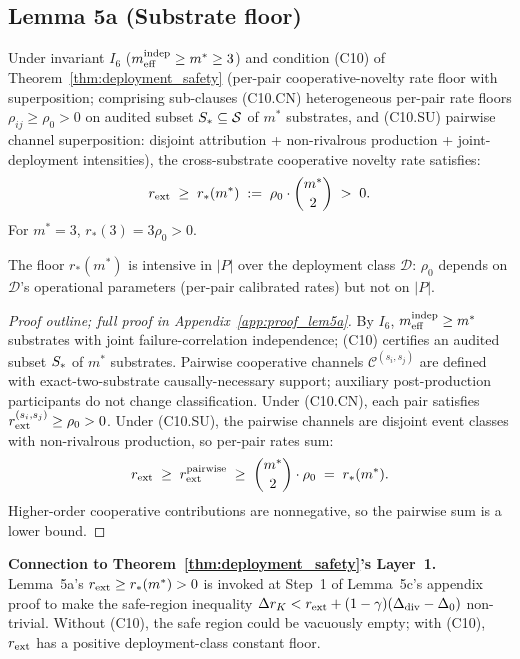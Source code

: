 \subsection{Lemma 5a (Substrate floor)}
\label{sec:lem5a}

\renewcommand{\thelemma}{5a}
\begin{lemma}
\label{lem:5a}
Under invariant $I_6$ ($m_{\mathrm{eff}}^{\mathrm{indep}} \geq m^* \geq 3$) and condition (C10) of
    Theorem~\ref{thm:deployment_safety} (per-pair cooperative-novelty rate
    floor with superposition; comprising sub-clauses (C10.CN) heterogeneous
    per-pair rate floors $\rho_{ij} \geq \rho_0 > 0$ on audited subset $S_*
    \subseteq \mathcal{S}$ of $m^*$ substrates, and (C10.SU) pairwise channel
    superposition: disjoint attribution + non-rivalrous production +
    joint-deployment intensities), the cross-substrate cooperative novelty rate
    satisfies:
\[
  r_{\mathrm{ext}} \;\geq\; r_*(m^*) \;:=\; \rho_0 \cdot \binom{m^*}{2} \;>\; 0.
\]
For $m^* = 3$, $r_*(3) = 3\rho_0 > 0$.

The floor $r_*(m^*)$ is intensive in $|P|$ over the deployment
class $\mathcal{D}$: $\rho_0$ depends on $\mathcal{D}$'s
operational parameters (per-pair calibrated rates) but not on
$|P|$.
\end{lemma}

\begin{proof}[Proof outline; full proof in
Appendix~\ref{app:proof_lem5a}]
By $I_6$, $m_{\mathrm{eff}}^{\mathrm{indep}} \geq m^*$ substrates with joint failure-correlation
    independence; (C10) certifies an audited subset $S_*$ of $m^*$
    substrates.  Pairwise cooperative channels $\mathcal{C}^{(s_i, s_j)}$ are
    defined with exact-two-substrate causally-necessary support; auxiliary
    post-production participants do not change classification.  Under (C10.CN),
    each pair satisfies $r_{\mathrm{ext}}^{(s_i, s_j)} \geq \rho_0 > 0$.  Under (C10.SU),
    the pairwise channels are disjoint event classes with non-rivalrous
    production, so per-pair rates sum:
\[
  r_{\mathrm{ext}} \;\geq\; r_{\mathrm{ext}}^{\mathrm{pairwise}} \;\geq\; \binom{m^*}{2}
  \cdot \rho_0 \;=\; r_*(m^*).
\]
Higher-order cooperative contributions are nonnegative, so the
pairwise sum is a lower bound.
\end{proof}

\textbf{Connection to Theorem~\ref{thm:deployment_safety}'s
Layer~1.}  Lemma~5a's $r_{\mathrm{ext}} \geq r_*(m^*) > 0$ is invoked at
Step~1 of Lemma~5c's appendix proof to make the safe-region
inequality $\Delta r_K < r_{\mathrm{ext}} + (1-\gamma)(\Delta_{\mathrm{div}} - \Delta_0)$
non-trivial.  Without (C10), the safe region could be vacuously
empty; with (C10), $r_{\mathrm{ext}}$ has a positive deployment-class
constant floor.

